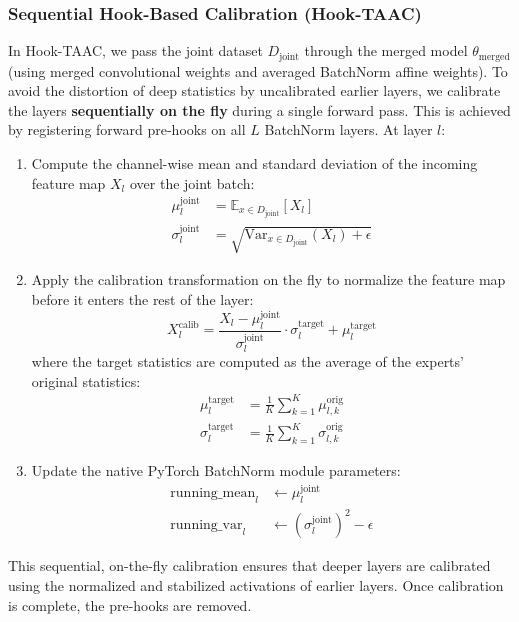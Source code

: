 \documentclass{article}
\theoremstyle{plain}
\theoremstyle{definition}
\theoremstyle{remark}
\begin{document}
\subsubsection{Sequential Hook-Based Calibration (Hook-TAAC)}
In Hook-TAAC, we pass the joint dataset $D_{\text{joint}}$ through the merged model $\theta_{\text{merged}}$ (using merged convolutional weights and averaged BatchNorm affine weights). To avoid the distortion of deep statistics by uncalibrated earlier layers, we calibrate the layers \textbf{sequentially on the fly} during a single forward pass. This is achieved by registering forward pre-hooks on all $L$ BatchNorm layers. At layer $l$:
\begin{enumerate}
\item Compute the channel-wise mean and standard deviation of the incoming feature map $X_l$ over the joint batch:
\begin{align}
\mu_{l}^{\text{joint}} &= \mathbb{E}_{x \in D_{\text{joint}}} [X_l] \\
\sigma_{l}^{\text{joint}} &= \sqrt{\text{Var}_{x \in D_{\text{joint}}} (X_l) + \epsilon}
\end{align}
\item Apply the calibration transformation on the fly to normalize the feature map before it enters the rest of the layer:
\begin{equation}
X_l^{\text{calib}} = \frac{X_l - \mu_{l}^{\text{joint}}}{\sigma_{l}^{\text{joint}}} \cdot \sigma_l^{\text{target}} + \mu_l^{\text{target}}
\end{equation}
where the target statistics are computed as the average of the experts' original statistics:
\begin{align}
\mu_l^{\text{target}} &= \frac{1}{K} \sum_{k=1}^K \mu_{l,k}^{\text{orig}} \\
\sigma_l^{\text{target}} &= \frac{1}{K} \sum_{k=1}^K \sigma_{l,k}^{\text{orig}}
\end{align}
\item Update the native PyTorch BatchNorm module parameters:
\begin{align}
\text{running\_mean}_l &\leftarrow \mu_{l}^{\text{joint}} \\
\text{running\_var}_l &\leftarrow (\sigma_{l}^{\text{joint}})^2 - \epsilon
\end{align}
\end{enumerate}

This sequential, on-the-fly calibration ensures that deeper layers are calibrated using the normalized and stabilized activations of earlier layers. Once calibration is complete, the pre-hooks are removed.
\end{document}
